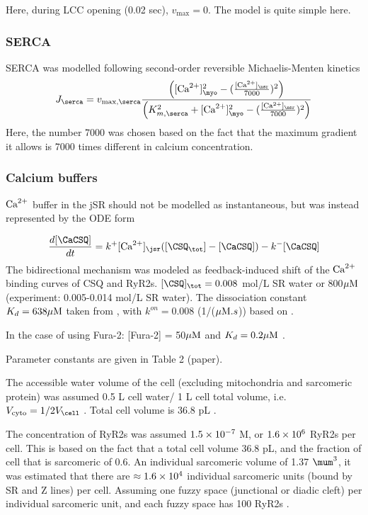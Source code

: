 Here, during LCC opening (0.02 sec), $v_\max=0$. The model is quite simple here.

\subsubsection{SERCA}

SERCA was modelled following second-order reversible Michaelis-Menten kinetics
\begin{equation}
J_\serca = v_{\max, \serca} \frac{\left([\Ca]_\myo^2 -
(\frac{[\Ca]_\nsr}{7000})^2\right)}{\left(K_{m,\serca}^2 + [\Ca]_\myo^2 -
(\frac{[\Ca]_\nsr}{7000})^2\right)}
\end{equation}
Here, the number 7000 was chosen based on the fact that the maximum gradient it
allows is 7000 times different in calcium concentration.

\subsubsection{Calcium buffers}

${\text{Ca}^{2+}}$ buffer in the jSR should not be modelled as instantaneous, but was instead
represented by the ODE form

\begin{equation}
\frac{d[\CaCSQ]}{dt} = k^+ [\Ca]_\jsr ([\CSQ_\tot] - [\CaCSQ]) - k^- [\CaCSQ]
\end{equation}
The bidirectional mechanism was modeled as feedback-induced shift of the ${\text{Ca}^{2+}}$
binding curves of CSQ and RyR2s. $[\CSQ]_\tot = 0.008$ mol/L SR water or
800${\mu\text{M}}$ (experiment: 0.005-0.014 mol/L SR water). The dissociation constant
$K_d=638 {\mu\text{M}}$ taken from \citep{shannon1997}, with $k^{on}=0.008$
(1/(${\mu\text{M}}.s$)) based on \citep{Donoso1995}.

In the case of using Fura-2: [Fura-2] = 50${\mu\text{M}}$ and $K_d=0.2{\mu\text{M}}$
\citep{grynkiewicz1985}.

Parameter constants are given in Table 2 (paper).

The accessible water volume of the cell (excluding mitochondria and sarcomeric
protein) was assumed 0.5 L cell water/ 1 L cell total volume, i.e. $V_\cyto=1/2
V_\cell$ \citep{berlin1994iccb, sipido1991}. Total cell volume is 36.8 pL
\citep{delbridge1997}.

The concentration of RyR2s was assumed $1.5\times 10^{-7}$ M, or $1.6\times 10^{6}$ RyR2s per
cell. This is based on the fact that a total cell volume 36.8 pL, and the
fraction of cell that is sarcomeric of 0.6. An individual sarcomeric volume of
1.37 $\mum^3$, it was estimated that there are $\approx 1.6\times 10^{4}$ individual
sarcomeric units (bound by SR and Z lines) per cell. Assuming one fuzzy space
(junctional or diadic cleft) per individual sarcomeric unit, and each fuzzy
space has 100 RyR2s \citep{wibo1991}.

